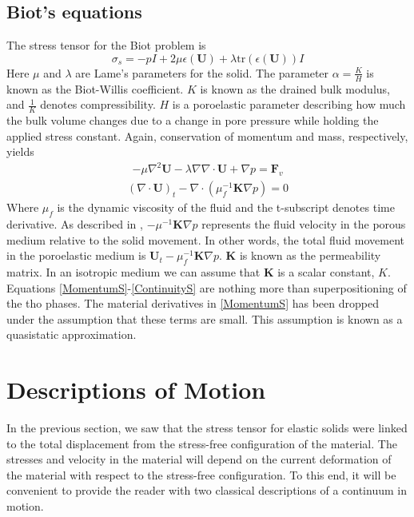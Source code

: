 \subsection{Biot's equations}
The stress tensor for the Biot problem is 
\[ \sigma_s = -pI + 2\mu \epsilon(\mathbf{U}) + \lambda\text{tr}(\epsilon(\mathbf{U}))I  \]
Here $\mu$ and $\lambda$ are Lame's parameters for the solid. The parameter $\alpha = \frac{K}{H}$ is known as the Biot-Willis coefficient. $K$ is known as the drained bulk modulus, and $\frac{1}{K}$ denotes compressibility. $H$ is a poroelastic parameter describing how much the bulk volume changes due to a change in pore pressure while holding the applied stress constant. Again, conservation of momentum and mass, respectively, yields
\begin{align}
	 - \mu \nabla ^2 \mathbf{U}
	 - \lambda \nabla \nabla \cdot \mathbf{U}
	 + \nabla p = \mathbf{F}_v \label{MomentumS}
\end{align}
\begin{align}
	 (\nabla \cdot \mathbf{U})_t
	 - \nabla \cdot (\mu_f^{-1} \mathbf{K} \nabla p) 
	 = 0 \label{ContinuityS}
\end{align}
Where $\mu_f$ is the dynamic viscosity of the fluid and the t-subscript denotes time derivative. As described in \cite{Niel13}, $-\mu^{-1}\mathbf{K} \nabla p$ represents the fluid velocity in the porous medium relative to the solid movement. In other words, the total fluid movement in the poroelastic medium is $\mathbf{U}_t - \mu_f^{-1}\mathbf{K} \nabla p$. $\mathbf{K}$ is known as the permeability matrix. In an isotropic medium we can assume that $\mathbf{K}$ is a scalar constant, $K$.
\\
Equations \eqref{MomentumS}-\eqref{ContinuityS} are nothing more than superpositioning of the tho phases. The material derivatives in \eqref{MomentumS} has been dropped under the assumption that these terms are small. This assumption is known as a quasistatic approximation. 
\\

\section{Descriptions of Motion} \label{sec:DoM}
In the previous section, we saw that the stress tensor for elastic solids were linked to the total displacement from the stress-free configuration of the material. The stresses and velocity in the material will depend on the current deformation of the material with respect to the stress-free configuration. To this end, it will be convenient to provide the reader with two classical descriptions of a continuum in motion. 
\\
\\
